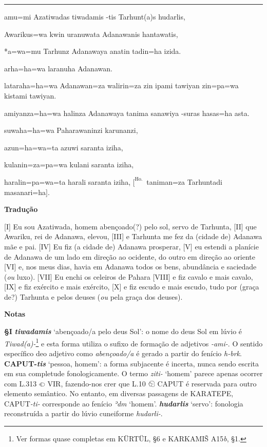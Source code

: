 \vspace{10pt}
\hrule
\vspace{10pt}


\setcounter{parcount}{0}
\begin{parnumbersr}

	\raggedright%
	\itshape%

	amu=mi Azatiwadas tiwadamis -tis Tarhunt{(a)}s hudarlis,

	Awarikus=wa \lbreak{} kwin uranuwata Adanawanis hantawatis,

	*a=wa=mu Tarhunz Adanawaya anatin tadin=ha izida.

	arha=ha=wa laranuha Adanawan.

	lataraha=ha=wa Adanawan=za walirin=za zin ipami tawiyan zin=pa=wa kistami
	tawiyan.

	amiyanza=ha=wa halinza Adanawaya tanima sanawiya -suras
	hasas=ha asta.

	suwaha=ha=wa Paharawaninzi karunanzi,

	azun=ha=wa=ta azuwi saranta iziha,

	kulanin=za=pa=wa kulani saranta iziha,

	haralin=pa=wa=ta harali saranta iziha, $[^\text{Ho.}$\ taniman=za Tarhuntadi masanari=ha$]$.


\end{parnumbersr}


\clearpage%
\noindent\textbf{Tradução}

[I] Eu sou Azatiwada, homem abençoado{(?)} pelo sol, servo de Tarhunta, [II] que
Awariku, rei de Adanawa, elevou, [III] e Tarhunta me fez da (cidade de)
Adanawa mãe e pai. [IV] Eu fiz (a cidade de) Adanawa prosperar, [V] eu estendi
a planície de Adanawa de um lado em direção ao ocidente, do outro em direção
ao oriente [VI] e, nos meus dias, havia em Adanawa todos os bens, abundância e
saciedade (\emph{ou} luxo). [VII] Eu enchi os celeiros de Pahara [VIII] e fiz
cavalo e mais cavalo, [IX] e fiz exército e mais exército, [X] e fiz escudo e
mais escudo, tudo por {(graça de?)} Tarhunta e pelos deuses (\emph{ou} pela
graça dos deuses).

\bigskip
\noindent\textbf{Notas}

\smallskip
\noindent\textbf{§I}\tabto{2em}
\textbf{\emph{tiwadamis}} `abençoado/a pelo deus Sol': o nome do deus Sol em
lúvio é \emph{Tiwad{(a)}-}\footnote{Ver formas quase completas em KÜRTÜL, §6 e
	KARKAMIŠ A15\emph{b}, §1.} e esta forma utiliza o sufixo de formação de
adjetivos \emph{-ami-}.
O sentido específico deo adjetivo como \emph{abençoado/a} é gerado a partir do
fenício \emph{h-brk}.
\textbf{CAPUT-\emph{tis}} `pessoa, homem': a forma subjacente é incerta, nunca
sendo escrita em sua completude fonologicamente.
O termo \emph{ziti-} `homem' parece apenas ocorrer com L.313 𔕠 VIR, fazendo-nos
crer que L.10 𔐉 CAPUT é reservada para outro elemento semântico.
No entanto, em diversas passagens de KARATEPE, CAPUT\emph{-ti-} corresponde ao
fenício \emph{ʾdm} `homem'.
\textbf{\emph{hudarlis}} `servo': fonologia reconstruída a partir do
lúvio cuneiforme \emph{hudarli-}.

